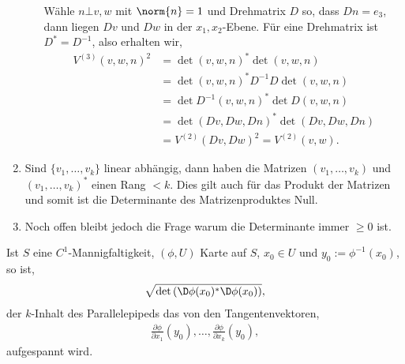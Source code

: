\begin{prop}
\begin{enumerate}[label=\arabic{*}.)]
\begin{enumerate}[label=(\alph{*})]
Wähle $n\bot v,w$ mit $\norm{n} = 1$ und Drehmatrix $D$ so, dass $Dn = e_3$,
dann liegen $Dv$ und $Dw$ in der $x_1,x_2$-Ebene. Für eine Drehmatrix ist
$D^*=D^{-1}$, also erhalten wir,
\begin{align*}
V^{(3)}(v,w,n)^2 &= \det (v,w,n)^*\det(v,w,n) \\ 
&= \det (v,w,n)^* D^{-1}D \det(v,w,n) \\
&= \det D^{-1}(v,w,n)^*\det D(v,w,n) \\ 
&= \det (Dv,Dw,Dn)^*\det (Dv,Dw,Dn) \\
&= V^{(2)}(Dv,Dw)^2 = V^{(2)}(v,w).  
\end{align*}
\end{enumerate}
\item Sind $\{v_1,\ldots,v_k\}$ linear abhängig, dann haben die Matrizen
$(v_1,\ldots,v_k)$ und $(v_1,\ldots,v_k)^*$ einen Rang $<k$. Dies gilt auch für
das Produkt der Matrizen und somit ist die Determinante des Matrizenproduktes
Null.
\item Noch offen bleibt jedoch die Frage warum die Determinante 
immer $\ge 0$ ist.
\end{enumerate}
\end{prop}

\begin{cor}
\label{prop:4.18}
Ist $S$ eine $C^1$-Mannigfaltigkeit, $(\phi, U)$ Karte auf $S$, $x_0\in U$ und
$y_0 := \phi^{-1}(x_0)$, so ist,
\begin{align*}
\sqrt{\det\left(\D\phi(x_0)^*\D\phi(x_0)\right)},
\end{align*}
der $k$-Inhalt des Parallelepipeds das von
den Tangentenvektoren,
\begin{align*}
\frac{\partial \phi}{\partial x_1}(y_0), \ldots, \frac{\partial \phi}{\partial
x_k}(y_0),
\end{align*}
aufgespannt wird.\fishhere
\end{cor}

